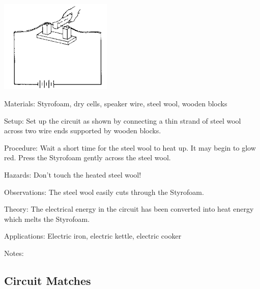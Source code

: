 \begin{multicols}{2}
\begin{center}
\includegraphics[width=0.4\textwidth]{./img/source/heat-current.png}
\end{center}

\begin{description*}
\item[Materials:]{Styrofoam, dry cells, speaker wire, steel wool, wooden blocks}
\item[Setup:]{Set up the circuit as shown by connecting a thin strand of steel wool across two wire ends supported by wooden blocks.}
\item[Procedure:]{Wait a short time for the steel wool to heat up. It may begin to glow red. Press the Styrofoam gently across the steel wool.}
\item[Hazards:]{Don't touch the heated steel wool!}
\item[Observations:]{The steel wool easily cuts through the Styrofoam.}
\item[Theory:]{The electrical energy in the circuit has been converted into heat energy which melts the Styrofoam.}
\item[Applications:]{Electric iron, electric kettle, electric cooker}
\item[Notes:]{}
\end{description*}

\subsection{Circuit Matches}



\end{multicols}
